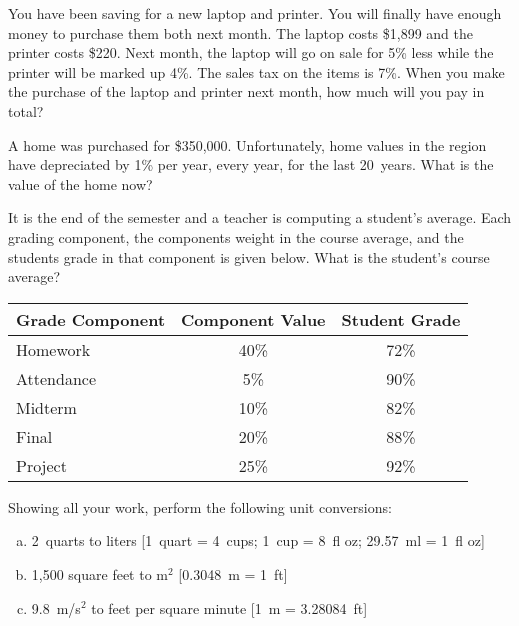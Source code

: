 \documentclass[12pt,letterpaper]{exam}
\begin{document}
\examtitle
{} 
\scores
\bottomline
\newpage

\begin{questions}

\newpage
\question[10] You have been saving for a new laptop and printer. You will finally have enough money to purchase them both next month. The laptop costs \$1,899 and the printer costs \$220. Next month, the laptop will go on sale for 5\% less while the printer will be marked up 4\%. The sales tax on the items is 7\%. When you make the purchase of the laptop and printer next month, how much will you pay in total?



\newpage
\question[10] A home was purchased for \$350,000. Unfortunately, home values in the region have depreciated by 1\% per year, every year, for the last 20~years. What is the value of the home now? 



\newpage
\question[10] It is the end of the semester and a teacher is computing a student's average. Each grading component, the components weight in the course average, and the students grade in that component is given below. What is the student's course average? \par
	\begin{table}[H]
	\centering
	\begin{tabular}{lcc}
	Grade Component & Component Value & Student Grade \\ \hline
	Homework & 40\% & 72\% \\
	Attendance & \phantom{0}5\% & 90\% \\
	Midterm & 10\% & 82\% \\
	Final & 20\% & 88\% \\
	Project & 25\% & 92\%
	\end{tabular}
	\end{table}



\newpage
\question[10] Showing all your work, perform the following unit conversions:
	\begin{enumerate}[(a)]
	\item 2~quarts to liters [1~quart = 4~cups; 1~cup = 8~fl oz; 29.57~ml = 1~fl oz]
	\item 1,500 square feet to m$^2$ [0.3048~m = 1~ft]
	\item 9.8~m/s$^2$ to feet per square minute [1~m = 3.28084~ft]
	\end{enumerate}




\end{questions}
\end{document}
